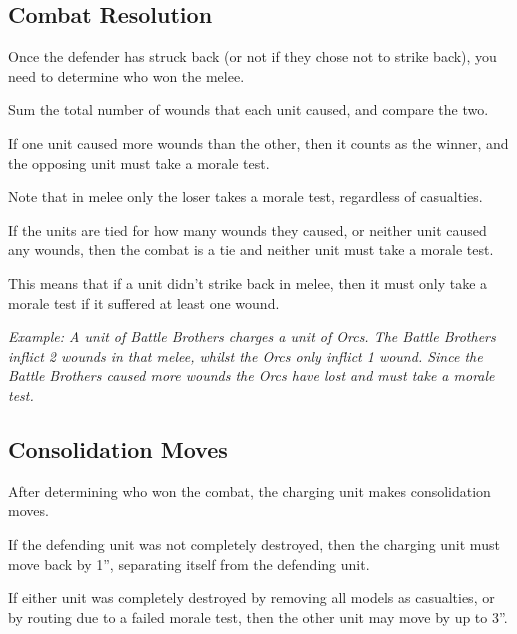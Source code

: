 \documentclass[9pt, a4paper, bookmarks=false]{extarticle}            %
\begin{document}
\begin{multicols}{2}

\subsection{Combat Resolution}

Once the defender has struck back (or not if they chose not to strike back), you need to determine who won the melee.

Sum the total number of wounds that each unit caused, and compare the two.

If one unit caused more wounds than the other, then it counts as the winner, and the opposing unit must take a morale test.

Note that in melee only the loser takes a morale test, regardless of casualties.

If the units are tied for how many wounds they caused, or neither unit caused any wounds, then the combat is a tie and neither unit must take a morale test.

This means that if a unit didn’t strike back in melee, then it must only take a morale test if it suffered at least one wound.

\textit{Example: A unit of Battle Brothers charges a unit of Orcs. The Battle Brothers inflict 2 wounds in that melee, whilst the Orcs only inflict 1 wound. Since the Battle Brothers caused more wounds the Orcs have lost and must take a morale test.}

\subsection{Consolidation Moves}

After determining who won the combat, the charging unit makes consolidation moves.

If the defending unit was not completely destroyed, then the charging unit must move back by 1”, separating itself from the defending unit.

If either unit was completely destroyed by removing all models as casualties, or by routing due to a failed morale test, then the other unit may move by up to 3”.

\vfill\null

\columnbreak

\vfill\null

\end{multicols}
\end{document}

